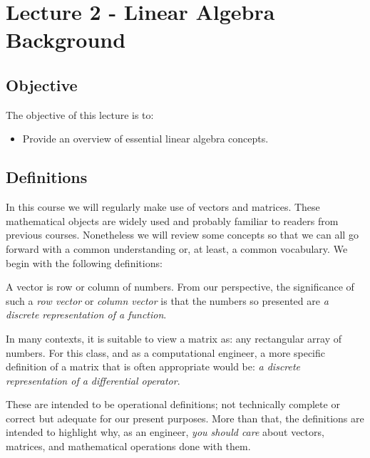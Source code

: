 \chapter{Lecture 2 - Linear Algebra Background}
\label{ch:lec2n}
\section{Objective}
The objective of this lecture is to:
\begin{itemize}
\item Provide an overview of essential linear algebra concepts.
\end{itemize}
\setcounter{lstannotation}{0}

\section{Definitions}
In this course we will regularly make use of vectors and matrices.  These mathematical objects are widely used and probably familiar to readers from previous courses.  Nonetheless we will review some concepts so that we can all go forward with a common understanding or, at least, a common vocabulary.  We begin with the following definitions:

\begin{definition}[Vector]
A vector is row or column of numbers.  From our perspective, the significance of such a \emph{row vector} or \emph{column vector} is that the numbers so presented are \emph{a discrete representation of a function}.
\end{definition}

\begin{definition}[Matrix]
In many contexts, it is suitable to view a matrix as: any rectangular array of numbers.  For this class, and as a computational engineer, a more specific definition of a matrix that is often appropriate would be: \emph{a discrete representation of a differential operator}. 
\end{definition}

These are intended to be operational definitions; not technically complete or correct but adequate for our present purposes.  More than that, the definitions are intended to highlight why, as an engineer, \emph{you should care} about vectors, matrices, and mathematical operations done with them. 

